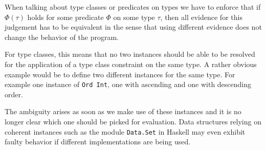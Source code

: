 When talking about type classes or predicates on types we have to enforce that if $\Phi(\tau)$ holds for some predicate $\Phi$ on some type $\tau$,
then all evidence for this judgement has to be equivalent in the sense that using different evidence does not change the behavior of the program.

For type classes, this means that no two instances should be able to be resolved for the application of a type class constraint on the same type.
A rather obvious example would be to define two different instances for the same type.
For example one instance of \texttt{Ord Int}, one with ascending and one with descending order.

The ambiguity arises as soon as we make use of these instances and it is no longer clear which one should be picked for evaluation.
Data structures relying on coherent instances such as the module \texttt{Data.Set} in Haskell may even exhibit faulty behavior if different implementations are being used. \cite{Kilpatrick2019-cy}





